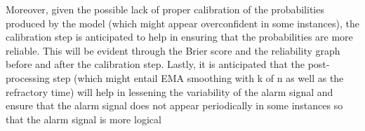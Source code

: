 \documentclass[conference]{IEEEtran}
\begin{document}
Moreover, given the possible lack of proper calibration of the probabilities produced by the model (which might appear overconfident in some instances), the calibration step is anticipated to help in ensuring that the probabilities are more reliable. This will be evident through the Brier score and the reliability graph before and after the calibration step. Lastly, it is anticipated that the post-processing step (which might entail EMA smoothing with k of n as well as the refractory time) will help in lessening the variability of the alarm signal and ensure that the alarm signal does not appear periodically in some instances so that the alarm signal is more logical




\end{document}
